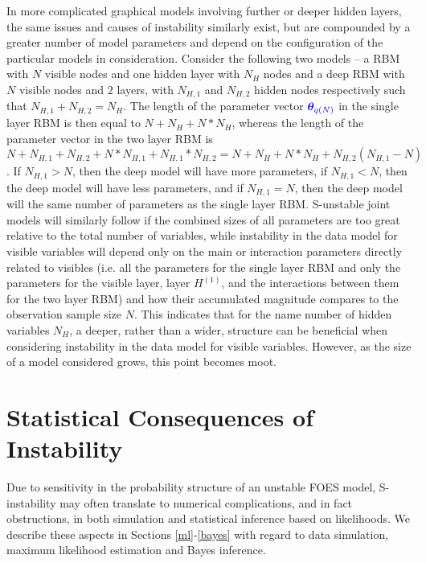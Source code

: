 \documentclass[numbib]{imamat}
\theoremstyle{theorem}
\theoremstyle{lemma}
\theoremstyle{example}
\theoremstyle{corollary}
\theoremstyle{definition}
\theoremstyle{remark}
\theoremstyle{approximation}
\theoremstyle{scheme}
\newcommand{\thetaidx}{q(N)}
\newcommand{\thetaN}{\boldsymbol \theta_{\thetaidx}}
\newcommand{\ak}[1]{{\color{blue} #1}}
\begin{document}
In more complicated graphical models involving further or deeper hidden layers, the same issues and causes of instability similarly exist, but are compounded by a greater number of model parameters \ak{and depend on the configuration of the particular models in consideration. Consider the following two models -- a RBM with $N$ visible nodes and one hidden layer with $N_H$ nodes and a deep RBM with $N$ visible nodes and $2$ layers, with $N_{H,1}$ and $N_{H,2}$ hidden nodes respectively such that $N_{H,1} + N_{H,2} = N_H$. The length of the parameter vector $\ak{\thetaN}$ in the single layer RBM is then equal to $N + N_H + N*N_H$, whereas the length of the parameter vector in the two layer RBM is $N + N_{H,1} + N_{H,2} + N*N_{H,1} + N_{H,1}*N_{H,2} = N + N_H + N*N_H + N_{H,2}(N_{H,1} - N)$. If $N_{H,1} > N$, then the deep model will have more parameters, if $N_{H,1} < N$, then the deep model will have less parameters, and if $N_{H,1} = N$, then the deep model will the same number of parameters as the single layer RBM.} S-unstable joint models will similarly follow if the combined sizes of all parameters are too great relative to the total number of variables, while instability in the data model for visible variables will depend only on the main or interaction parameters directly related to visibles \ak{(i.e. all the parameters for the single layer RBM and only the parameters for the visible layer, layer $H^{(1)}$, and the interactions between them for the two layer RBM)} and how their accumulated magnitude compares to the observation sample size \(N\). \ak{This indicates that for the name number of hidden variables $N_H$, a deeper, rather than a wider, structure can be beneficial when considering instability in the data model for visible variables. However, as the size of a model considered grows, this point becomes moot.}

\hypertarget{implications}{%
\section{Statistical Consequences of Instability}\label{implications}}

Due to \ak{sensitivity in the probability structure of an unstable FOES model, S-instability} may often translate to numerical complications, and in fact obstructions, in both simulation and statistical inference based on likelihoods. We describe these aspects in Sections \ref{ml}-\ref{bayes} with regard to data simulation, maximum likelihood estimation and Bayes inference.
\end{document}
